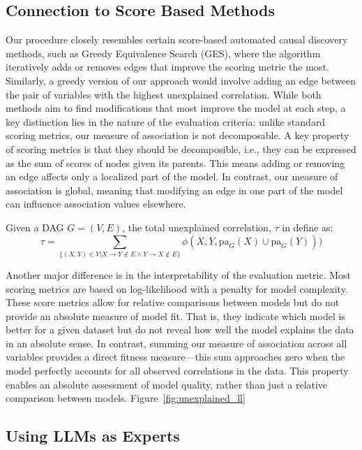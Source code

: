 \documentclass{uai2025} %
\begin{document}
\subsection{Connection to Score Based Methods}

Our procedure closely resembles certain score-based automated causal discovery
methods, such as Greedy Equivalence Search (GES), where the algorithm
iteratively adds or removes edges that improve the scoring metric the most.
Similarly, a greedy version of our approach would involve adding an edge
between the pair of variables with the highest unexplained correlation. While
both methods aim to find modifications that most improve the model at each
step, a key distinction lies in the nature of the evaluation criteria: unlike
standard scoring metrics, our measure of association is not decomposable. A key
property of scoring metrics is that they should be decomposible, i.e., they can
be expressed as the sum of scores of nodes given its parents. This means adding
or removing an edge affects only a localized part of the model. In contrast,
our measure of association is global, meaning that modifying an edge in one
part of the model can influence association values elsewhere.

Given a DAG $ G = (V, E) $, the total unexplained correlation, $\tau$ in define as:
\begin{equation}
	\tau = \sum_{\{ (X, Y) \in V | X \rightarrow Y \not \in E \wedge Y \rightarrow X \not \in E \} } \phi(X, Y, \mathrm{pa}_G(X) \cup \mathrm{pa}_G(Y)))
\end{equation}

Another major difference is in the interpretability of the evaluation metric.
Most scoring metrics are based on log-likelihood with a penalty for model
complexity. These score metrics allow for relative comparisons between models
but do not provide an absolute measure of model fit. That is, they indicate
which model is better for a given dataset but do not reveal how well the model
explains the data in an absolute sense. In contrast, summing our measure of
association across all variables provides a direct fitness measure—this sum
approaches zero when the model perfectly accounts for all observed correlations
in the data. This property enables an absolute assessment of model quality,
rather than just a relative comparison between models. Figure~\ref{fig:unexplained_ll}


\subsection{Using LLMs as Experts}
 
\end{document}
